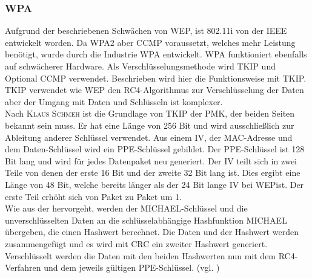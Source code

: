\subsubsection{\ac{WPA}} 
Aufgrund der beschriebenen Schwächen von \ac{WEP}, ist 802.11i von der \ac{IEEE} entwickelt worden. Da \ac{WPA2} aber \ac{CCMP} voraussetzt, welches mehr Leistung benötigt, wurde durch die Industrie \ac{WPA} entwickelt. \ac{WPA} funktioniert ebenfalls auf schwächerer Hardware. Als Verschlüsselungsmethode wird \ac{TKIP} und Optional \ac{CCMP} verwendet. Beschrieben wird hier die Funktionsweise mit \ac{TKIP}. \\
\ac{TKIP} verwendet wie \ac{WEP} den RC4-Algorithmus zur Verschlüsselung der Daten aber der Umgang mit Daten und Schlüsseln ist komplexer. \\
Nach \textsc{Klaus Schmeh} \cite{SWB-378541420} ist die Grundlage von \ac{TKIP} der \ac{PMK}, der beiden Seiten bekannt sein muss. Er hat eine Länge von 256 Bit und wird ausschließlich zur Ableitung anderer Schlüssel verwendet. Aus einem \ac{IV}, der MAC-Adresse und dem Daten-Schlüssel wird ein \ac{PPE}-Schlüssel gebildet. Der \ac{PPE}-Schlüssel ist 128 Bit lang und wird für jedes Datenpaket neu generiert.
Der \ac{IV} teilt sich in zwei Teile von denen der erste 16 Bit und der zweite 32 Bit lang ist. Dies ergibt eine Länge von 48 Bit, welche bereits länger als der 24 Bit lange \ac{IV} bei \ac{WEP}ist. Der erste Teil erhöht sich von Paket zu Paket um 1.\\
Wie aus der  hervorgeht, werden der MICHAEL-Schlüssel und die unverschlüsselten Daten an die schlüsselabhängige Hashfunktion MICHAEL übergeben, die einen Hashwert berechnet. Die Daten und der Hashwert werden zusammengefügt und es wird mit \ac{CRC} ein zweiter Hashwert generiert. Verschlüsselt werden die Daten mit den beiden Hashwerten nun mit dem RC4-Verfahren und dem jeweils gültigen \ac{PPE}-Schlüssel. (vgl. \cite{SWB-378541420})

